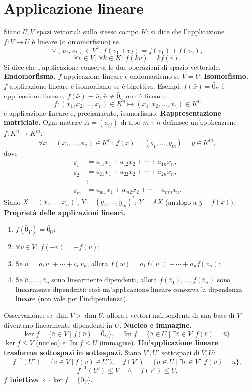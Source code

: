 \documentclass[11pt,a4paper]{article}
\newcommand{\pagina}[1]{\clearpage}
\begin{document}
\section*{Applicazione lineare}
Siano $U,V$ spazi vettoriali sullo stesso campo $K$: si dice che l'applicazione $f:V\to U$ è lineare (o omomorfismo) se
\[\forall(\bar v_1,\bar v_2)\in V^2:\ f(\bar v_1+\bar v_2)=f(\bar v_1)+f(\bar v_2),\]
\[\forall\bar v\in V,\ \forall k\in K:\ f(k\bar v)=kf(\bar v).\]
\pagina{39}
Si dice che l'applicazione conserva le due operazioni di spazio vettoriale.
\textbf{Endomorfismo.} $f$ applicazione lineare è endomorfismo se $V=U$.
\textbf{Isomorfismo.} $f$ applicazione lineare è isomorfismo se è bigettiva.
Esempi: $f(\bar x)=\bar0_U$ è applicazione lineare. $f(\bar x)=\bar u$, $\bar u\ne\bar0_U$ non è lineare.
\[f:(x_1,x_2,\ldots,x_n)\in K^n\mapsto(x_1,x_2,\ldots,x_n)\in K^n\]
è applicazione lineare e, precisamente, isomorfismo.
\textbf{Rappresentazione matriciale.} Ogni matrice $A=(a_{ij})$ di tipo $m\times n$ definisce un'applicazione $f:K^n\to K^m$:
\[\forall\bar x=(x_1,\ldots,x_n)\in K^n:\ f(\bar x)=(y_1,\ldots,y_m)=\bar y\in K^m,\]
dove
\[\begin{aligned}y_1&=a_{11}x_1+a_{12}x_2+\cdots+a_{1n}x_n,\\y_2&=a_{21}x_1+a_{22}x_2+\cdots+a_{2n}x_n,\\&\vdots\\y_m&=a_{m1}x_1+a_{m2}x_2+\cdots+a_{mn}x_n.\end{aligned}\]
Siano $X=(x_1,\ldots,x_n)^t$, $Y=(y_1,\ldots,y_m)^t$: $Y=AX$ (analogo a $y=f(x)$).
\pagina{40}
\textbf{Proprietà delle applicazioni lineari.}
\begin{enumerate}\item $f(\bar0_V)=\bar0_U$;
\item $\forall\bar v\in V:\ f(-\bar v)=-f(\bar v)$;
\item Se $\bar w=a_1\bar v_1+\cdots+a_n\bar v_n$, allora $f(\bar w)=a_1f(\bar v_1)+\cdots+a_nf(\bar v_n)$;
\item Se $\bar v_1,\ldots,\bar v_n$ sono linearmente dipendenti, allora $f(\bar v_1),\ldots,f(\bar v_n)$ sono linearmente dipendenti: cioè un'applicazione lineare conserva la dipendenza lineare (non vale per l'indipendenza).
\end{enumerate}
Osservazione: se $\dim V>\dim U$, allora i vettori indipendenti di una base di $V$ diventano linearmente dipendenti in $U$.
\textbf{Nucleo e immagine.}
\[\ker f=\{\bar v\in V\mid f(\bar v)=\bar0_U\},\quad\operatorname{Im}f=\{\bar u\in U\mid\exists\bar v\in V:f(\bar v)=\bar u\}.\]
$\ker f\le V$ (nucleo) e $\operatorname{Im}f\le U$ (immagine).
\textbf{Un'applicazione lineare trasforma sottospazi in sottospazi.}
Siano $V',U'$ sottospazi di $V,U$:
\[f^{-1}(U')=\{\bar v\in V\mid f(\bar v)\in U'\},\quad f(V')=\{\bar u\in U\mid\exists\bar v\in V':f(\bar v)=\bar u\},\]
\[f^{-1}(U')\le V\quad\wedge\quad f(V')\le U.\]
\pagina{41}
\textbf{$f$ iniettiva $\Longleftrightarrow\ker f=\{\bar0_V\}$.}
\end{document}

